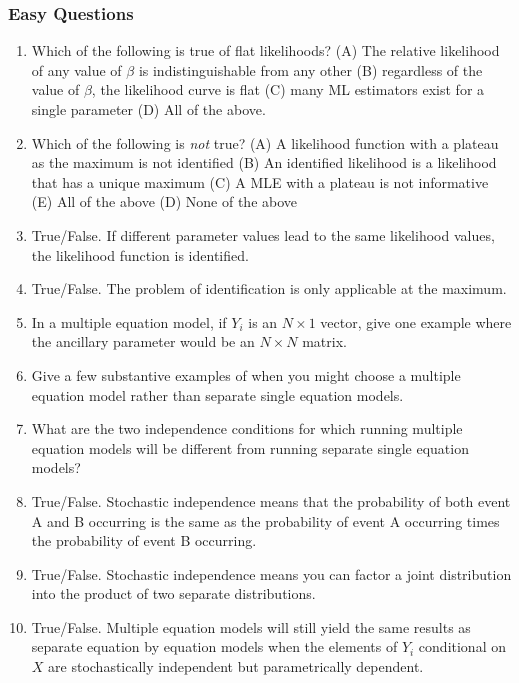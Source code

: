 \documentclass[11pt]{article}
\begin{document}
\subsubsection{Easy Questions}
\begin{enumerate}
\item Which of the following is true of flat likelihoods? (A) The relative likelihood of any value of $\beta$ is indistinguishable from any other (B) regardless of the value of $\beta$, the likelihood curve is flat (C) many ML estimators exist for a single parameter (D) All of the above. %
\item Which of the following is \emph{not} true? (A) A likelihood function with a plateau as the maximum is not identified (B) An identified likelihood is a likelihood that has a unique maximum (C) A MLE with a plateau is not informative  (E) All of the above (D) None of the above  %
\item True/False. If different parameter values lead to the same likelihood values, the likelihood function is identified. %
\item True/False. The problem of identification is only applicable at the maximum. %
\item In a multiple equation model, if $Y_i$ is an $N \times 1$ vector, give one example where the ancillary parameter would be an $N \times N$ matrix. %
\item Give a few substantive examples of when you might choose a multiple equation model rather than separate single equation models.
\item What are the two independence conditions for which running multiple equation models will be different from running separate single equation models?
\item True/False. Stochastic independence means that the probability of both event A and B occurring is the same as the probability of event A occurring times the probability of event B occurring. %
\item True/False. Stochastic independence means you can factor a joint distribution into the product of two separate distributions.  %
\item True/False. Multiple equation models will still yield the same results as separate equation by equation models when the elements of $Y_i$ conditional on $X$ are stochastically independent but parametrically dependent. %

\end{enumerate}
\end{document}
